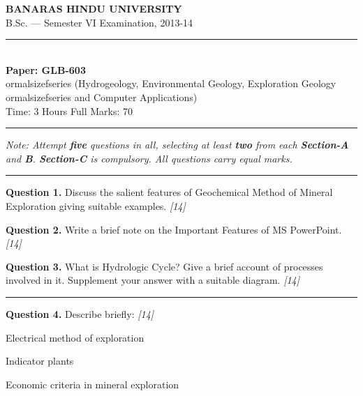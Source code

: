 \documentclass[11pt,a4paper]{article}
\newcommand{\pts}[1]{\hfill   \textit{[#1]}}
\begin{document}
\begin{center}
  {\large\bfseries BANARAS HINDU UNIVERSITY}\\[2pt]
  {\normalsize B.Sc. --- Semester VI Examination, 2013-14}\\[6pt]
  \rule{0.8\linewidth}{0.5pt}\\[6pt]
  {\large\bfseries Paper: GLB-603}\\[2pt]
  {
ormalsizefseries (Hydrogeology, Environmental Geology, Exploration Geology}\\[2pt]
  {
ormalsizefseries and Computer Applications)}\\[4pt]
  {\normalsize Time: 3 Hours \hfill Full Marks: 70}\\
\end{center}
\rule{\linewidth}{0.4pt}
\smallskip



\noindent   \textit{Note: Attempt   \textbf{five} questions in all, selecting at least   \textbf{two} from each   \textbf{Section-A} and   \textbf{B}.   \textbf{Section-C} is   \textit{compulsory}. All questions carry equal marks.}
\bigskip

\bigskip


\rule{\linewidth}{0.4pt}\smallskip




\noindent   \textbf{Question 1.} Discuss the salient features of Geochemical Method of Mineral Exploration giving suitable examples. \pts{14}

\medskip


\noindent   \textbf{Question 2.} Write a brief note on the Important Features of MS PowerPoint. \pts{14}

\medskip


\noindent   \textbf{Question 3.} What is Hydrologic Cycle? Give a brief account of processes involved in it. Supplement your answer with a suitable diagram. \pts{14}

\bigskip


\rule{\linewidth}{0.4pt}\smallskip




\noindent   \textbf{Question 4.} Describe briefly: \pts{14}

\begin{parts}
  \item Electrical method of exploration
  \item Indicator plants
  \item Economic criteria in mineral exploration
\end{parts}
\end{document}

